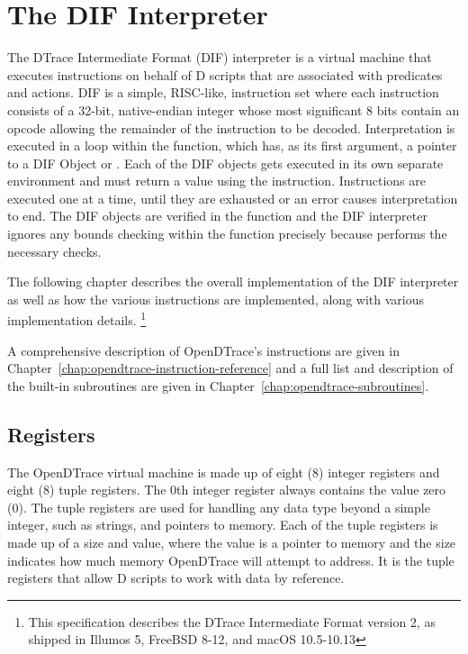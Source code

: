 \section{The DIF Interpreter}

The DTrace Intermediate Format (DIF) interpreter is a virtual machine
that executes instructions on behalf of D scripts that are associated
with predicates and actions.  DIF is a simple, RISC-like, instruction
set where each instruction consists of a 32-bit, native-endian integer
whose most significant 8 bits contain an opcode allowing the remainder
of the instruction to be decoded.  Interpretation is executed in a
loop within the  function, which has, as
its first argument, a pointer to a DIF Object or
. Each of the DIF objects gets executed in its
own separate environment and must return a value using the
 instruction. Instructions are executed one at a
time, until they are exhausted or an error causes interpretation to
end. The DIF objects are verified in the
 function and the DIF interpreter
ignores any bounds checking within the 
function precisely because  performs
the necessary checks.

The following chapter describes the overall implementation of the DIF
interpreter as well as how the various instructions are implemented,
along with various implementation details. \footnote{This
  specification describes the DTrace Intermediate Format version 2, as
  shipped in Illumos 5, FreeBSD 8-12, and macOS 10.5-10.13}

A comprehensive description of OpenDTrace's instructions are given in
Chapter~\ref{chap:opendtrace-instruction-reference} and a full list
and description of the built-in subroutines are given in
Chapter~\ref{chap:opendtrace-subroutines}.

\subsection{Registers}
\label{sec:dif-registers}

The OpenDTrace virtual machine is made up of eight (8) integer registers
and eight (8) tuple registers.  The 0th integer register always
contains the value zero (0).  The tuple registers are used for
handling any data type beyond a simple integer, such as strings, and
pointers to memory.  Each of the tuple registers is made up of a size
and value, where the value is a pointer to memory and the size
indicates how much memory OpenDTrace will attempt to address.  It is
the tuple registers that allow D scripts to work with data by reference.

